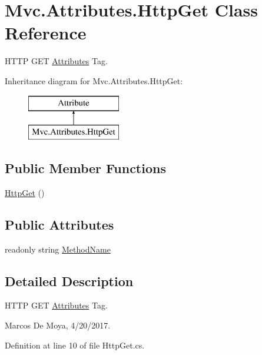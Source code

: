 \hypertarget{class_mvc_1_1_attributes_1_1_http_get}{}\section{Mvc.\+Attributes.\+Http\+Get Class Reference}
\label{class_mvc_1_1_attributes_1_1_http_get}


H\+T\+TP G\+ET \hyperlink{namespace_mvc_1_1_attributes}{Attributes} Tag.  


Inheritance diagram for Mvc.\+Attributes.\+Http\+Get\+:\begin{figure}[H]
\begin{center}
\leavevmode
\includegraphics[height=2.000000cm]{class_mvc_1_1_attributes_1_1_http_get}
\end{center}
\end{figure}
\subsection*{Public Member Functions}
\begin{DoxyCompactItemize}
\item 
\hyperlink{class_mvc_1_1_attributes_1_1_http_get_aa0d0bdd66c44edb19f1089e6afd5c192}{Http\+Get} ()
\end{DoxyCompactItemize}
\subsection*{Public Attributes}
\begin{DoxyCompactItemize}
\item 
readonly string \hyperlink{class_mvc_1_1_attributes_1_1_http_get_a203e3cb85a69ad40d2a139804579ad3d}{Method\+Name}
\end{DoxyCompactItemize}


\subsection{Detailed Description}
H\+T\+TP G\+ET \hyperlink{namespace_mvc_1_1_attributes}{Attributes} Tag. 

Marcos De Moya, 4/20/2017. 

Definition at line 10 of file Http\+Get.\+cs.



